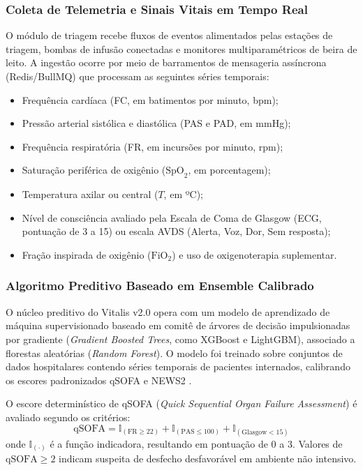 \subsubsection{Coleta de Telemetria e Sinais Vitais em Tempo Real}
O módulo de triagem recebe fluxos de eventos alimentados pelas estações de triagem, bombas de infusão conectadas e monitores multiparamétricos de beira de leito. A ingestão ocorre por meio de barramentos de mensageria assíncrona (Redis/BullMQ) que processam as seguintes séries temporais:
\begin{itemize}[noitemsep]
    \item Frequência cardíaca (FC, em batimentos por minuto, bpm);
    \item Pressão arterial sistólica e diastólica (PAS e PAD, em mmHg);
    \item Frequência respiratória (FR, em incursões por minuto, rpm);
    \item Saturação periférica de oxigênio ($\text{SpO}_2$, em porcentagem);
    \item Temperatura axilar ou central ($T$, em ºC);
    \item Nível de consciência avaliado pela Escala de Coma de Glasgow (ECG, pontuação de 3 a 15) ou escala AVDS (Alerta, Voz, Dor, Sem resposta);
    \item Fração inspirada de oxigênio ($\text{FiO}_2$) e uso de oxigenoterapia suplementar.
\end{itemize}

\subsubsection{Algoritmo Preditivo Baseado em Ensemble Calibrado}
O núcleo preditivo do Vitalis v2.0 opera com um modelo de aprendizado de máquina supervisionado baseado em comitê de árvores de decisão impulsionadas por gradiente (\textit{Gradient Boosted Trees}, como XGBoost e LightGBM), associado a florestas aleatórias (\textit{Random Forest}). O modelo foi treinado sobre conjuntos de dados hospitalares contendo séries temporais de pacientes internados, calibrando os escores padronizados qSOFA \cite{singer_sepsis:2016} e NEWS2 \cite{rcp_news2:2017}.

O escore determinístico de qSOFA (\textit{Quick Sequential Organ Failure Assessment}) é avaliado segundo os critérios:
\begin{equation}
    \text{qSOFA} = \mathbb{I}_{(\text{FR} \ge 22)} + \mathbb{I}_{(\text{PAS} \le 100)} + \mathbb{I}_{(\text{Glasgow} < 15)}
\end{equation}
onde $\mathbb{I}_{(\cdot)}$ é a função indicadora, resultando em pontuação de 0 a 3. Valores de $\text{qSOFA} \ge 2$ indicam suspeita de desfecho desfavorável em ambiente não intensivo.

